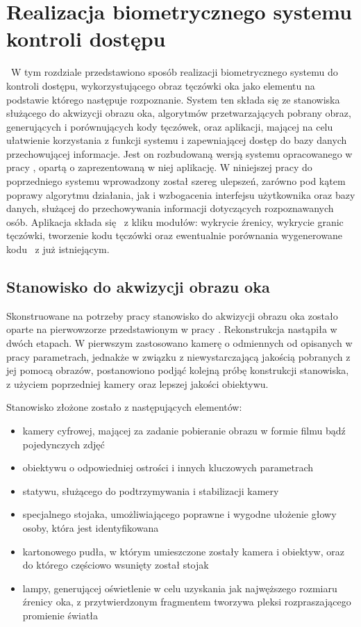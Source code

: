 \chapter{Realizacja biometrycznego systemu kontroli dostępu}
\label{cha:realizacja}
~W tym rozdziale przedstawiono sposób realizacji biometrycznego systemu do kontroli dostępu, wykorzystującego obraz tęczówki oka jako elementu na podstawie którego następuje rozpoznanie. System ten składa się ze stanowiska służącego do akwizycji obrazu oka, algorytmów przetwarzających pobrany obraz, generujących i porównujących kody tęczówek, oraz aplikacji, mającej na celu ułatwienie korzystania z funkcji systemu i zapewniającej dostęp do bazy danych przechowującej informacje. Jest on rozbudowaną wersją systemu opracowanego w pracy \cite{Gl11}, opartą o zaprezentowaną w niej aplikację. W niniejszej pracy do poprzedniego systemu wprowadzony został szereg ulepszeń, zarówno pod kątem poprawy algorytmu działania, jak i wzbogacenia interfejsu użytkownika oraz bazy danych, służącej do przechowywania informacji dotyczących rozpoznawanych osób. Aplikacja składa się ~z kliku modułów: wykrycie źrenicy, wykrycie granic tęczówki, tworzenie kodu tęczówki oraz ewentualnie porównania wygenerowane kodu ~z już istniejącym.

\section{Stanowisko do akwizycji obrazu oka}
\label{sec:stanowisko}
Skonstruowane na potrzeby pracy stanowisko do akwizycji obrazu oka zostało oparte na pierwowzorze przedstawionym w pracy \cite{Gl11}. Rekonstrukcja nastąpiła w dwóch etapach. W pierwszym zastosowano kamerę o odmiennych od opisanych w pracy \cite{Gl11} parametrach, jednakże w związku z niewystarczającą jakością pobranych z jej pomocą obrazów, postanowiono podjąć kolejną próbę konstrukcji stanowiska, z użyciem poprzedniej kamery oraz lepszej jakości obiektywu.

Stanowisko złożone zostało z następujących elementów:
\begin{itemize}
 \item kamery cyfrowej, mającej za zadanie pobieranie obrazu w formie filmu bądź pojedynczych zdjęć
 \item obiektywu o odpowiedniej ostrości i innych kluczowych parametrach
 \item statywu, służącego do podtrzymywania i stabilizacji kamery
 \item specjalnego stojaka, umożliwiającego poprawne i wygodne ułożenie głowy osoby, która jest identyfikowana
 \item kartonowego pudła, w którym umieszczone zostały kamera i obiektyw, oraz do którego częściowo wsunięty został stojak 
 \item lampy, generującej oświetlenie w celu uzyskania jak najwęższego rozmiaru źrenicy oka, z przytwierdzonym fragmentem tworzywa pleksi rozpraszającego promienie światła
 \end{itemize}

